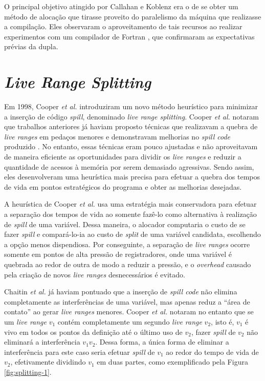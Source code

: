 \documentclass[
	12pt,				%
	openright,			%
	twoside,			%
	a4paper,			%
	tcc,			%
	]{ABNT-DC-UEL}
\begin{document}
O principal objetivo atingido por Callahan e Koblenz era o de se obter um método de alocação que tirasse proveito do paralelismo da máquina que realizasse a compilação. Eles observaram o aproveitamento de tais recursos ao realizar experimentos com um compilador de Fortran \cite{callahan:91}, que confirmaram as expectativas prévias da dupla.

\section{\textit{Live Range Splitting}}

Em 1998, Cooper \textit{et al.} \cite{cooper:98} introduziram um novo método heurístico para minimizar a inserção de código \textit{spill}, denominado \textit{live range splitting}. Cooper \textit{et al.} notaram que trabalhos anteriores já haviam proposto técnicas que realizavam a quebra de \textit{live ranges} em pedaços menores e demonstravam melhorias no \textit{spill code} produzido \cite{briggs:92, briggs2:92, chow:84}. No entanto, essas técnicas eram pouco ajustadas e não aproveitavam de maneira eficiente as oportunidades para dividir os \textit{live ranges} e reduzir a quantidade de acessos à memória por serem demasiado agressivas. Sendo assim, eles desenvolveram uma heurística mais precisa para efetuar a quebra dos tempos de vida em pontos estratégicos do programa e obter as melhorias desejadas.

A heurística de Cooper \textit{et al.} usa uma estratégia mais conservadora para efetuar a separação dos tempos de vida ao somente fazê-lo como alternativa à realização de \textit{spill} de uma variável. Dessa maneira, o alocador computaria o custo de se fazer \textit{spill} e compará-lo-ia ao custo de \textit{split} de uma variável candidata, escolhendo a opção menos dispendiosa. Por conseguinte, a separação de \textit{live ranges} ocorre somente em pontos de alta pressão de registradores, onde uma variável é quebrada ao redor de outra de modo a reduzir a pressão, e o \textit{overhead} causado pela criação de novos \textit{live ranges} desnecessários é evitado.

Chaitin \textit{et al.} \cite{chaitin:82} já haviam pontuado que a inserção de \textit{spill code} não elimina completamente as interferências de uma variável, mas apenas reduz a ``área de contato'' ao gerar \textit{live ranges} menores. Cooper \textit{et al.} notaram no entanto que se um \textit{live range} $v_1$ contém completamente um segundo \textit{live range} $v_2$, isto é, $v_1$ é vivo em todos os pontos da definição até o último uso de $v_2$, fazer \textit{spill} de $v_2$ não eliminará a interferência $v_1v_2$. Dessa forma, a única forma de eliminar a interferência para este caso seria efetuar \textit{spill} de $v_1$ ao redor do tempo de vida de $v_2$, efetivamente dividindo $v_1$ em duas partes, como exemplificado pela Figura \ref{fig:splitting-1}.
\end{document}
